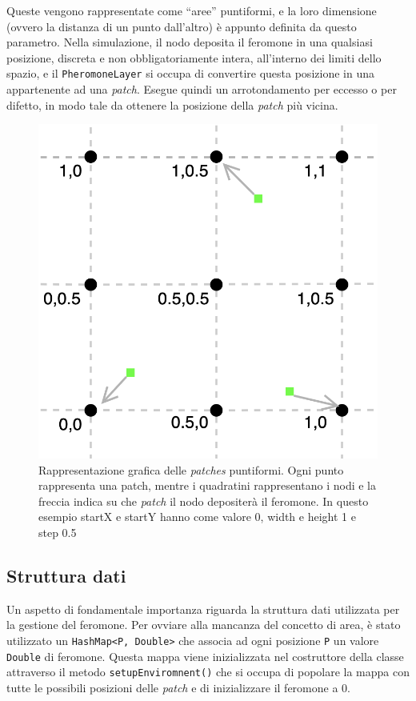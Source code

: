 Queste vengono rappresentate come ``aree'' puntiformi, e la loro dimensione (ovvero la distanza di un punto dall'altro) è appunto definita da questo parametro.
Nella simulazione, il nodo deposita il feromone in una qualsiasi posizione, discreta e non obbligatoriamente intera, all'interno dei limiti dello spazio, e il \texttt{PheromoneLayer} 
si occupa di convertire questa posizione in una appartenente ad una \textit{patch}. 
Esegue quindi un arrotondamento per eccesso o per difetto, in modo tale da ottenere la posizione della \textit{patch} più vicina.
\begin{figure}[ht]
    \centering
    \includegraphics[width=.5\linewidth]{figures/patch-nodi.png}
    \caption{Rappresentazione grafica delle \textit{patches} puntiformi. Ogni punto rappresenta una patch,
    mentre i quadratini rappresentano i nodi e la freccia indica su che \textit{patch} il nodo depositerà il feromone. In questo esempio
    startX e startY hanno come valore 0, width e height 1 e step 0.5}\label{fig:patch-nodi}
\end{figure}
\clearpage
\subsection{Struttura dati}
Un aspetto di fondamentale importanza riguarda la struttura dati utilizzata per la gestione del feromone.
Per ovviare alla mancanza del concetto di area, è stato utilizzato un \texttt{HashMap<P, Double>} che associa ad ogni posizione \texttt{P} un valore \texttt{Double} di feromone.
Questa mappa viene inizializzata nel costruttore della classe attraverso il metodo \texttt{setupEnviromnent()} che si occupa di popolare la mappa
con tutte le possibili posizioni delle \textit{patch} e di inizializzare il feromone a 0.

